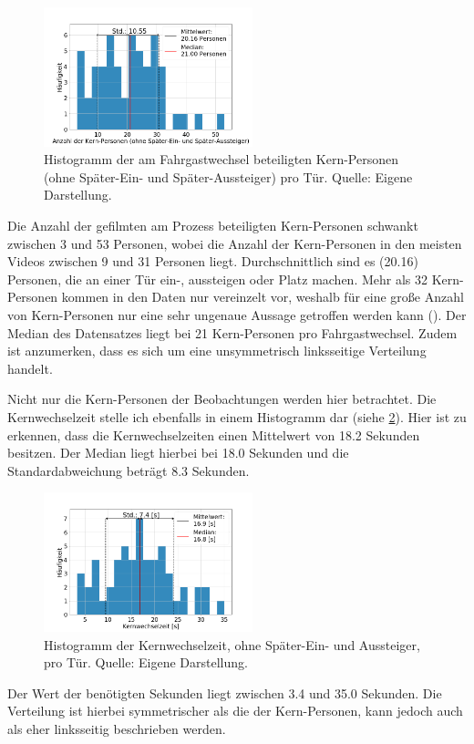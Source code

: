 \begin{figure}[H]
	\centering
		\includegraphics[width=0.54\textwidth]{pictures/data_evaluation/transferTime/hist_core_persons.png}
	\caption{Histogramm der am Fahrgastwechsel beteiligten Kern-Personen (ohne Später-Ein- und Später-Aussteiger) pro Tür. Quelle: Eigene Darstellung.}
	\label{fig:histPersonen}
\end{figure}
Die Anzahl der gefilmten am Prozess beteiligten Kern-Personen schwankt zwischen 3 und 53 Personen, wobei die Anzahl der Kern-Personen in den meisten Videos zwischen 9 und 31 Personen liegt. Durchschnittlich sind es  (20.16) Personen, die an einer Tür ein-, aussteigen oder Platz machen. Mehr als 32 Kern-Personen kommen in den Daten nur vereinzelt vor, weshalb für eine große Anzahl von Kern-Personen nur eine sehr ungenaue Aussage getroffen werden kann (\cite{Fahrmeir.2009}). Der Median des Datensatzes liegt bei 21 Kern-Personen pro Fahrgastwechsel. Zudem ist anzumerken, dass es sich um eine unsymmetrisch linksseitige Verteilung handelt.

Nicht nur die Kern-Personen der Beobachtungen werden hier betrachtet. Die Kernwechselzeit stelle ich ebenfalls in einem Histogramm dar (siehe \figurename \ref{fig:histTimes}). Hier ist zu erkennen, dass die Kernwechselzeiten einen Mittelwert von 18.2 Sekunden besitzen. Der Median liegt hierbei bei 18.0 Sekunden und die Standardabweichung beträgt 8.3 Sekunden. 
\begin{figure}[H]
	\centering
		\includegraphics[width=0.54\textwidth]{pictures/data_evaluation/transferTime/hist_core_transfer_time.png}
	\caption{Histogramm der Kernwechselzeit, ohne Später-Ein- und Aussteiger, pro Tür. Quelle: Eigene Darstellung.}
	\label{fig:histTimes}
\end{figure}
Der Wert der benötigten Sekunden liegt zwischen 3.4 und 35.0 Sekunden. Die Verteilung ist hierbei symmetrischer als die der Kern-Personen, kann jedoch auch als eher linksseitig beschrieben werden.

